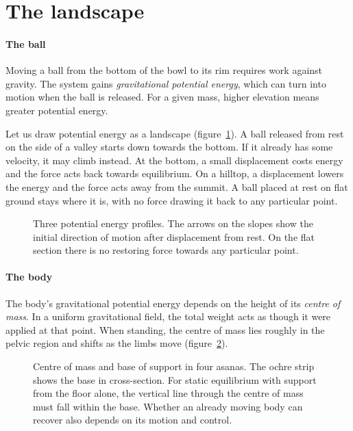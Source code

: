 \section{The landscape}\label{sec:paesaggio}

\paragraph{The ball} Moving a ball from the bottom of the bowl to its rim requires work against gravity. The system gains \emph{gravitational potential energy}, which can turn into motion when the ball is released. For a given mass, higher elevation means greater potential energy.

Let us draw potential energy as a landscape (figure~\ref{fig:paesaggio}). A ball released from rest on the side of a valley starts down towards the bottom. If it already has some velocity, it may climb instead. At the bottom, a small displacement costs energy and the force acts back towards equilibrium. On a hilltop, a displacement lowers the energy and the force acts away from the summit. A ball placed at rest on flat ground stays where it is, with no force drawing it back to any particular point.

\begin{figure}
\caption{Three potential energy profiles. The arrows on the slopes show the initial direction of motion after displacement from rest. On the flat section there is no restoring force towards any particular point.}
\label{fig:paesaggio}
\end{figure}

\paragraph{The body} The body's gravitational potential energy depends on the height of its \emph{centre of mass}. In a uniform gravitational field, the total weight acts as though it were applied at that point. When standing, the centre of mass lies roughly in the pelvic region and shifts as the limbs move (figure~\ref{fig:basi}).

\begin{figure}
\caption{Centre of mass and base of support in four asanas. The ochre strip shows the base in cross-section. For static equilibrium with support from the floor alone, the vertical line through the centre of mass must fall within the base. Whether an already moving body can recover also depends on its motion and control.}
\label{fig:basi}
\end{figure}

